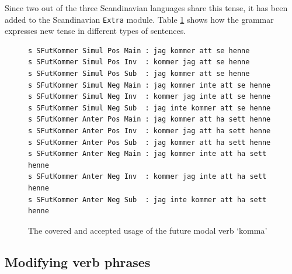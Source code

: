 \documentclass{report}
\begin{document}
Since two out of the three Scandinavian languages share this
tense, it has been added to the Scandinavian \verb-Extra- module.
Table \ref{fig:kommeratt} shows how the grammar expresses new tense
in different types of sentences.
\begin{figure}[h]
\begin{verbatim}
s SFutKommer Simul Pos Main : jag kommer att se henne
s SFutKommer Simul Pos Inv  : kommer jag att se henne
s SFutKommer Simul Pos Sub  : jag kommer att se henne
s SFutKommer Simul Neg Main : jag kommer inte att se henne
s SFutKommer Simul Neg Inv  : kommer jag inte att se henne
s SFutKommer Simul Neg Sub  : jag inte kommer att se henne
s SFutKommer Anter Pos Main : jag kommer att ha sett henne
s SFutKommer Anter Pos Inv  : kommer jag att ha sett henne
s SFutKommer Anter Pos Sub  : jag kommer att ha sett henne
s SFutKommer Anter Neg Main : jag kommer inte att ha sett henne
s SFutKommer Anter Neg Inv  : kommer jag inte att ha sett henne
s SFutKommer Anter Neg Sub  : jag inte kommer att ha sett henne
\end{verbatim}
\caption{The covered and accepted usage of the future modal verb `komma'}
  \label{fig:kommeratt}
\end{figure}

%
\subsection{Modifying verb phrases}
\end{document}
